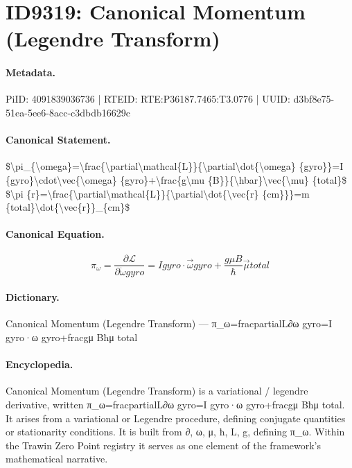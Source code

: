 \section*{ID9319: Canonical Momentum (Legendre Transform)}
\paragraph{Metadata.}
PiID: 4091839036736 | RTEID: RTE:P36187.7465:T3.0776 | UUID: d3bf8e75-51ea-5ee6-8acc-c3dbdb16629c

\paragraph{Canonical Statement.}
\$\textbackslash{}pi\_\{\textbackslash{}omega\}=\textbackslash{}frac\{\textbackslash{}partial\textbackslash{}mathcal\{L\}\}\{\textbackslash{}partial\textbackslash{}dot\{\textbackslash{}omega\} \{gyro\}\}=I \{gyro\}\textbackslash{}cdot\textbackslash{}vec\{\textbackslash{}omega\} \{gyro\}+\textbackslash{}frac\{g\textbackslash{}mu \{B\}\}\{\textbackslash{}hbar\}\textbackslash{}vec\{\textbackslash{}mu\} \{total\}\$ \$\textbackslash{}pi \{r\}=\textbackslash{}frac\{\textbackslash{}partial\textbackslash{}mathcal\{L\}\}\{\textbackslash{}partial\textbackslash{}dot\{\textbackslash{}vec\{r\} \{cm\}\}\}=m \{total\}\textbackslash{}dot\{\textbackslash{}vec\{r\}\}\_\{cm\}\$

\paragraph{Canonical Equation.}
\[
\pi_{\omega}=\frac{\partial\mathcal{L}}{\partial\dot{\omega} {gyro}}=I {gyro}\cdot\vec{\omega} {gyro}+\frac{g\mu {B}}{\hbar}\vec{\mu} {total}
\]

\paragraph{Dictionary.}
Canonical Momentum (Legendre Transform) — π\_ω=fracpartialL∂ω gyro=I gyro·ω gyro+fracgμ Bħμ total

\paragraph{Encyclopedia.}
Canonical Momentum (Legendre Transform) is a variational / legendre derivative, written π\_ω=fracpartialL∂ω gyro=I gyro·ω gyro+fracgμ Bħμ total. It arises from a variational or Legendre procedure, defining conjugate quantities or stationarity conditions. It is built from ∂, ω, μ, ħ, L, g, defining π\_ω. Within the Trawin Zero Point registry it serves as one element of the framework's mathematical narrative.
